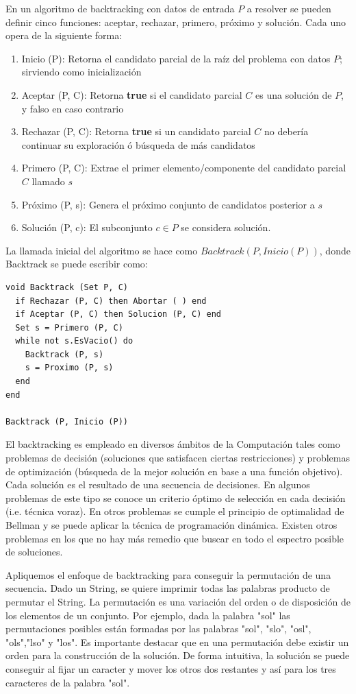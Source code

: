 En un algoritmo de backtracking con datos de entrada $P$ a resolver se pueden definir cinco funciones: aceptar, rechazar, primero, próximo y solución. Cada uno opera de la siguiente forma:
\begin{enumerate}
\item Inicio (P): Retorna el candidato parcial de la raíz del problema con datos $P$; sirviendo como inicialización
\item Aceptar (P, C): Retorna \textbf{true} si el candidato parcial $C$ es una solución de $P$, y falso en caso contrario
\item Rechazar (P, C): Retorna \textbf{true} si un candidato parcial $C$ no debería continuar su exploración ó búsqueda de más candidatos
\item Primero (P, C): Extrae el primer elemento/componente del candidato parcial $C$ llamado $s$
\item Próximo (P, s): Genera el próximo conjunto de candidatos posterior a $s$
\item Solución (P, c): El subconjunto $c \in P$ se considera solución.
\end{enumerate}

La llamada inicial del algoritmo se hace como $Backtrack (P, Inicio (P))$, donde Backtrack se puede escribir como:

\begin{lstlisting}[upquote=true, language=pseudo]
void Backtrack (Set P, C)
  if Rechazar (P, C) then Abortar ( ) end
  if Aceptar (P, C) then Solucion (P, C) end
  Set s = Primero (P, C)
  while not s.EsVacio() do
    Backtrack (P, s)
    s = Proximo (P, s)
  end
end

Backtrack (P, Inicio (P))
\end{lstlisting}

El backtracking es empleado en diversos ámbitos de la Computación tales como problemas de decisión (soluciones que satisfacen ciertas restricciones) y problemas de optimización (búsqueda de la mejor solución en base a una función objetivo). Cada solución es el resultado de una secuencia de decisiones. En algunos problemas de este tipo se conoce un criterio óptimo de selección en cada decisión (i.e. técnica voraz). En otros problemas se cumple el principio de optimalidad de Bellman y se puede aplicar la técnica de programación dinámica. Existen otros problemas en los que no hay más remedio que buscar en todo el espectro posible de soluciones.

Apliquemos el enfoque de backtracking para conseguir la permutación de una secuencia. Dado un String, se quiere imprimir todas las palabras producto de permutar el String. La permutación es una variación del orden o de disposición de los elementos de un conjunto. Por ejemplo, dada la palabra "sol" las permutaciones posibles están formadas por las palabras "sol", "slo", "osl", "ols","lso" y "los". Es importante destacar que en una permutación debe existir un orden para la construcción de la solución. De forma intuitiva, la solución se puede conseguir al fijar un caracter y mover los otros dos restantes y así para los tres caracteres de la palabra "sol".


